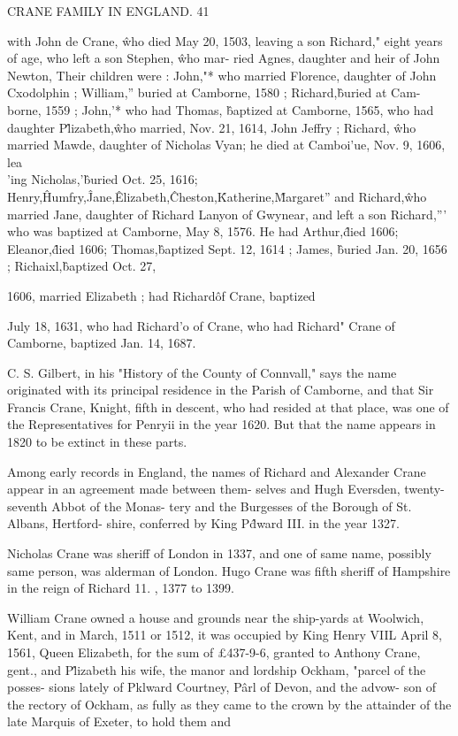 CRANE FAMILY IN ENGLAND. 41 

with John de Crane, \^ who died May 20, 1503, leaving a son 
Richard," eight years of age, who left a son Stephen, \^ who mar- 
ried Agnes, daughter and heir of John Newton, Their children 
were : John,"* who married Florence, daughter of John Cxodolphin ; 
William,'' buried at Camborne, 1580 ; Richard,\^ buried at Cam- 
borne, 1559 ; John,'* who had Thomas, \^ baptized at Camborne, 
1565, who had daughter P\^lizabeth,\^ who married, Nov. 21, 1614, 
John Jeffry ; Richard, \^ who married Mawde, daughter of Nicholas 
Vyan; he died at Camboi'ue, Nov. 9, 1606, lea\\'ing Nicholas,'\^ 
buried Oct. 25, 1616; Henry,\^ Humfry,\^ Jane,\^ Elizabeth,\^ 
Cheston,\^ Katherine,\^ Margaret'' and Richard,\^ who married Jane, 
daughter of Richard Lanyon of Gwynear, and left a son Richard,''' 
who was baptized at Camborne, May 8, 1576. He had Arthur,\^ 
died 1606; Eleanor,\^ died 1606; Thomas,\^ baptized Sept. 12, 
1614 ; James, \^ buried Jan. 20, 1656 ; Richaixl,\^ baptized Oct. 27, 

1606, married Elizabeth ; had Richard\^ of Crane, baptized 

July 18, 1631, who had Richard'o of Crane, who had Richard" 
Crane of Camborne, baptized Jan. 14, 1687. 

C. S. Gilbert, in his "History of the County of Connvall," 
says the name originated with its principal residence in the Parish 
of Camborne, and that Sir Francis Crane, Knight, fifth in descent, 
who had resided at that place, was one of the Representatives for 
Penryii in the year 1620. But that the name appears in 1820 to 
be extinct in these parts. 

Among early records in England, the names of Richard and 
Alexander Crane appear in an agreement made between them- 
selves and Hugh Eversden, twenty-seventh Abbot of the Monas- 
tery and the Burgesses of the Borough of St. Albans, Hertford- 
shire, conferred by King P\^dward III. in the year 1327. 

Nicholas Crane was sheriff of London in 1337, and one of same 
name, possibly same person, was alderman of London. Hugo 
Crane was fifth sheriff of Hampshire in the reign of Richard 11. , 
1377 to 1399. 

William Crane owned a house and grounds near the ship-yards 
at Woolwich, Kent, and in March, 1511 or 1512, it was occupied 
by King Henry VIIL April 8, 1561, Queen Elizabeth, for the sum 
of £437-9-6, granted to Anthony Crane, gent., and P\^lizabeth 
his wife, the manor and lordship Ockham, "parcel of the posses- 
sions lately of Pklward Courtney, P\^arl of Devon, and the advow- 
son of the rectory of Ockham, as fully as they came to the crown 
by the attainder of the late Marquis of Exeter, to hold them and 




